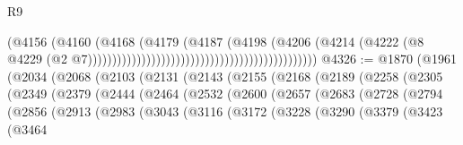 \begin{lexlean}{R9}
\begin{coremodule}
                                                                            (@4156
                                                                              (@4160
                                                                                (@4168
                                                                                  (@4179
                                                                                    (@4187
                                                                                      (@4198
                                                                                        (@4206
                                                                                          (@4214
                                                                                            (@4222
                                                                                              (@8
                                                                                                @4229
                                                                                                (@2
                                                                                                  @7)))))))))))))))))))))))))))))))))))))))))))))))
@4326 := @1870
    (@1961
      (@2034
        (@2068
          (@2103
            (@2131
              (@2143
                (@2155
                  (@2168
                    (@2189
                      (@2258
                        (@2305
                          (@2349
                            (@2379
                              (@2444
                                (@2464
                                  (@2532
                                    (@2600
                                      (@2657
                                        (@2683
                                          (@2728
                                            (@2794
                                              (@2856
                                                (@2913
                                                  (@2983
                                                    (@3043
                                                      (@3116
                                                        (@3172
                                                          (@3228
                                                            (@3290
                                                              (@3379
                                                                (@3423
                                                                  (@3464

\end{coremodule}
\end{lexlean}
